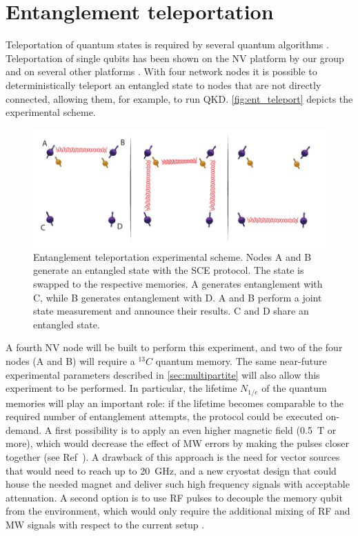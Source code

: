 \documentclass[a4paper, twoside]{article}
\begin{document}

\section{Entanglement teleportation}
\label{sec:teleportation}
Teleportation of quantum states is required by several quantum algorithms . Teleportation of single qubits has been shown on the NV platform by our group \cite{Pfaff2014} and on several other platforms \cite{Takeda2013, Wang2015, Valivarthi2016}.
With four network nodes it is possible to deterministically teleport an entangled state to nodes that are not directly connected, allowing them, for example, to run \ac{QKD}. \autoref{fig:ent_teleport} depicts the experimental scheme. 

\begin{figure}
	\includegraphics[width=\textwidth]{images/figure5}
	\caption{Entanglement teleportation experimental scheme. Nodes A and B generate an entangled state with the \ac{SCE} protocol. The state is swapped to the respective memories. A generates entanglement with C, while B generates entanglement with D. A and B perform a joint state measurement and announce their results. C and D share an entangled state. }
	\label{fig:ent_teleport}
\end{figure}

A fourth NV node will be built to perform this experiment, and two of the four nodes (A and B) will require a ${}^{13}C$ quantum memory. The same near-future experimental parameters described in \autoref{sec:multipartite} will also allow this experiment to be performed. In particular, the lifetime $N_{1/e}$ of the quantum memories will play an important role: if the lifetime becomes comparable to the required number of entanglement attempts, the protocol could be executed on-demand. A first possibility is to apply an even higher magnetic field (\SI{0.5}{T} or more), which would decrease the effect of \ac{MW} errors by making the pulses closer together (see Ref~\cite{Kalb2017}). A drawback of this approach is the need for vector sources that would need to reach up to \SI{20}{GHz}, and a new cryostat design that could house the needed magnet and deliver such high frequency signals with acceptable attenuation.
A second option is to use \ac{RF} pulses to decouple the memory qubit from the environment, which would only require the additional mixing of \ac{RF} and \ac{MW} signals with respect to the current setup \cite{Bradley2018}. 
\end{document}

